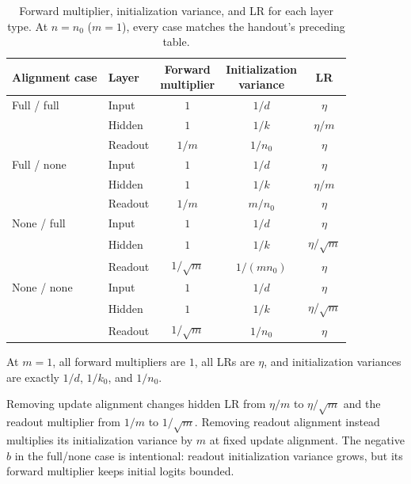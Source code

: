 \documentclass{article}
\begin{document}
\begin{table}[ht]
\centering
\small
\begin{tabular}{llccc}
\toprule
Alignment case & Layer & \shortstack{Forward\\multiplier} &
\shortstack{Initialization\\variance} & LR \\
\midrule
Full / full & Input & $1$ & $1/d$ & $\eta$ \\
 & Hidden & $1$ & $1/k$ & $\eta/m$ \\
 & Readout & $1/m$ & $1/n_0$ & $\eta$ \\
\midrule
Full / none & Input & $1$ & $1/d$ & $\eta$ \\
 & Hidden & $1$ & $1/k$ & $\eta/m$ \\
 & Readout & $1/m$ & $m/n_0$ & $\eta$ \\
\midrule
None / full & Input & $1$ & $1/d$ & $\eta$ \\
 & Hidden & $1$ & $1/k$ & $\eta/\sqrt m$ \\
 & Readout & $1/\sqrt m$ & $1/(mn_0)$ & $\eta$ \\
\midrule
None / none & Input & $1$ & $1/d$ & $\eta$ \\
 & Hidden & $1$ & $1/k$ & $\eta/\sqrt m$ \\
 & Readout & $1/\sqrt m$ & $1/n_0$ & $\eta$ \\
\bottomrule
\end{tabular}
\caption{Forward multiplier, initialization variance, and LR for each
layer type. At $n=n_0$ ($m=1$), every case matches the handout's preceding table.}
\label{tab:p40-rules}
\end{table}

At $m=1$, all forward multipliers are $1$, all LRs are $\eta$, and
initialization variances are exactly $1/d$, $1/k_0$, and $1/n_0$.

Removing update alignment changes hidden LR from $\eta/m$ to
$\eta/\sqrt m$ and the readout multiplier from $1/m$ to $1/\sqrt m$.
Removing readout alignment instead multiplies its initialization variance
by $m$ at fixed update alignment. The negative $b$ in the full/none case
is intentional: readout initialization variance grows, but its forward multiplier
keeps initial logits bounded.
\end{document}

